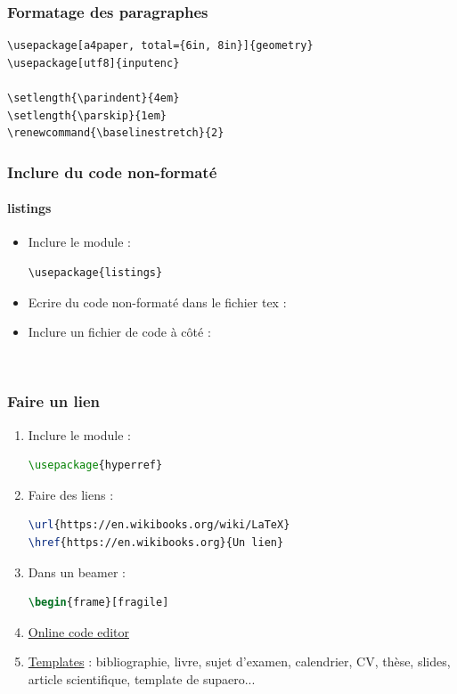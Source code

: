\documentclass{beamer}
\begin{document}
\begin{frame}[fragile]
    \frametitle{Formatage des paragraphes}
     \begin{lstlisting}
\usepackage[a4paper, total={6in, 8in}]{geometry}
\usepackage[utf8]{inputenc}

\setlength{\parindent}{4em}
\setlength{\parskip}{1em}
\renewcommand{\baselinestretch}{2}      
     \end{lstlisting}
\end{frame}

\begin{frame}[fragile]
    \frametitle{Inclure du code non-formaté}
    \framesubtitle{listings}
       \begin{itemize}
       \item<1-> Inclure le module :
     \begin{lstlisting}
\usepackage{listings}      
     \end{lstlisting}
       \item<2-> Ecrire du code non-formaté dans le fichier tex :

       \item<3-> Inclure un fichier de code à côté :
     \begin{lstlisting}[language=TeX]
       
     \end{lstlisting}
       \end{itemize}
\end{frame}

\begin{frame}[fragile]
    \frametitle{Faire un lien}
    \begin{enumerate}
        \item<1-> Inclure le module :
        \begin{lstlisting}[language=TeX]
\usepackage{hyperref}
        \end{lstlisting}
        \item<2-> Faire des liens :
        \begin{lstlisting}[language=TeX]
\url{https://en.wikibooks.org/wiki/LaTeX}
\href{https://en.wikibooks.org}{Un lien}
        \end{lstlisting}
        \item<3-> Dans un beamer :
        \begin{lstlisting}[language=TeX]
\begin{frame}[fragile]
        \end{lstlisting}
        \item<4-| alert@1> \href{https://www.codecogs.com/latex/eqneditor.php}{Online code editor}
        \item<5-| alert@1> \href{https://fr.sharelatex.com/templates}{Templates} : bibliographie, livre, sujet d'examen, calendrier, CV, thèse, slides, article scientifique, template de supaero...
    \end{enumerate}
\end{frame}
\end{document}
